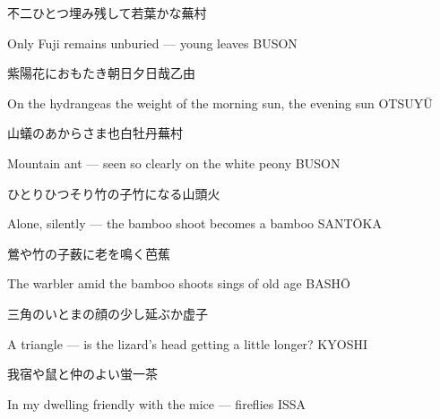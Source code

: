 \begin{haiku}
    {\FH 不二ひとつ埋み残して若葉かな}\hfill{\FH 蕪村}

    \vin{} Only Fuji
    \vin{} \vin{} remains unburied ---
    \vin{} \vin{} \vin{} young leaves \hspace{\fill} BUSON
\end{haiku}

\begin{haiku}
    {\FH 紫陽花におもたき朝日夕日哉}\hfill{\FH 乙由}

    \vin{} On the hydrangeas
    \vin{} \vin{} the weight of the morning sun,
    \vin{} \vin{} \vin{} the evening sun \hspace{\fill} OTSUY\={U}
\end{haiku}

\begin{haiku}
    {\FH 山蟻のあからさま也白牡丹}\hfill{\FH 蕪村}

    \vin{} Mountain ant ---
    \vin{} \vin{} seen so clearly
    \vin{} \vin{} \vin{} on the white peony \hspace{\fill} BUSON
\end{haiku}

\begin{haiku}
    {\FH ひとりひつそり竹の子竹になる}\hfill{\FH 山頭火}

    \vin{} Alone, silently ---
    \vin{} \vin{} the bamboo shoot
    \vin{} \vin{} \vin{} becomes a bamboo \hspace{\fill} SANT\={O}KA
\end{haiku}

\begin{haiku}
    {\FH 鶯や竹の子薮に老を鳴く}\hfill{\FH 芭蕉}

    \vin{} The warbler
    \vin{} \vin{} amid the bamboo shoots
    \vin{} \vin{} \vin{} sings of old age \hspace{\fill} BASH\={O}
\end{haiku}

\begin{haiku}
    {\FH 三角のいとまの顔の少し延ぶか}\hfill{\FH 虚子}

    \vin{} A triangle ---
    \vin{} \vin{} is the lizard's head getting
    \vin{} \vin{} \vin{} a little longer? \hspace{\fill} KYOSHI
\end{haiku}

\begin{haiku}
    {\FH 我宿や鼠と仲のよい蛍}\hfill{\FH 一茶}

    \vin{} In my dwelling
    \vin{} \vin{} friendly with the mice ---
    \vin{} \vin{} \vin{} fireflies \hspace{\fill} ISSA
\end{haiku}

